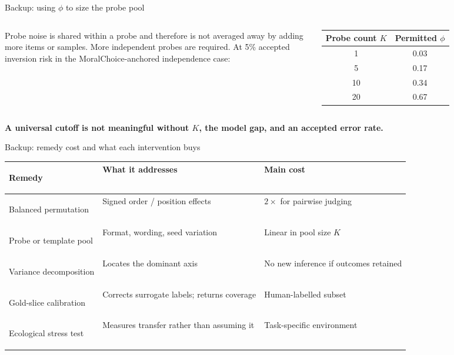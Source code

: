 \documentclass[aspectratio=169,10pt]{beamer}
\begin{document}
\begin{frame}{Backup: using \texorpdfstring{$\phi$}{phi} to size the probe pool}
  \begin{columns}[c,onlytextwidth]
      \small Probe noise is shared within a probe and therefore is not averaged
      away by adding more items or samples. More independent probes are required.
      At 5\% accepted inversion risk in the MoralChoice-anchored independence case:
      \centering
      \begin{tabular}{cc}
        \toprule
        Probe count $K$ & Permitted $\phi$ \\
        \midrule
        1  & 0.03 \\
        5  & 0.17 \\
        10 & 0.34 \\
        20 & 0.67 \\
        \bottomrule
      \end{tabular}
  \end{columns}
  \vspace{0.45cm}
  \centering\bfseries A universal cutoff is not meaningful without $K$, the model gap, and an accepted error rate.
\end{frame}

\begin{frame}{Backup: remedy cost and what each intervention buys}
  \small
  \begin{tabularx}{\textwidth}{>{\bfseries\raggedright\arraybackslash}p{3.0cm}>{\raggedright\arraybackslash}X>{\raggedright\arraybackslash}p{3.2cm}}
    \toprule
    Remedy & What it addresses & Main cost \\
    \midrule
    Balanced permutation & Signed order / position effects & $2\times$ for pairwise judging \\
    Probe or template pool & Format, wording, seed variation & Linear in pool size $K$ \\
    Variance decomposition & Locates the dominant axis & No new inference if outcomes retained \\
    Gold-slice calibration & Corrects surrogate labels; returns coverage & Human-labelled subset \\
    Ecological stress test & Measures transfer rather than assuming it & Task-specific environment \\
    \bottomrule
  \end{tabularx}
\end{frame}
\end{document}
